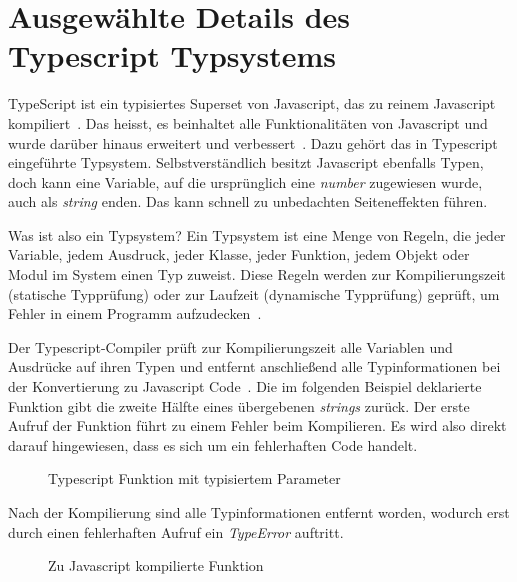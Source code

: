 
\section{Ausgewählte Details des Typescript Typsystems}
\label{sec:basics:typescript}
TypeScript ist ein typisiertes Superset von Javascript, das zu reinem Javascript kompiliert~\cite{typescript}.
Das heisst, es beinhaltet alle Funktionalitäten von Javascript und wurde darüber hinaus erweitert und verbessert~\cite{superset}.
Dazu gehört das in Typescript eingeführte Typsystem. Selbstverständlich besitzt Javascript ebenfalls Typen, doch kann eine Variable,
auf die ursprünglich eine \emph{number} zugewiesen wurde, auch als \emph{string} enden. Das kann schnell zu unbedachten Seiteneffekten führen.

Was ist also ein Typsystem? Ein Typsystem ist eine Menge von Regeln, die jeder Variable, jedem Ausdruck, jeder Klasse,
jeder Funktion, jedem Objekt oder Modul im System einen Typ zuweist.
Diese Regeln werden zur  Kompilierungszeit (statische Typprüfung) oder zur Laufzeit (dynamische Typprüfung) geprüft,
um Fehler in einem Programm aufzudecken~\cite{typescript-typesystem-medium}.

Der Typescript-Compiler prüft zur Kompilierungszeit alle Variablen und Ausdrücke auf ihren Typen und entfernt anschließend alle Typinformationen
bei der Konvertierung zu Javascript Code~\cite{typescript-github-specification}.
Die im folgenden Beispiel deklarierte Funktion gibt die zweite Hälfte eines übergebenen \emph{strings} zurück.
Der erste Aufruf der Funktion führt zu einem Fehler beim Kompilieren. Es wird also direkt darauf hingewiesen, dass es sich um ein fehlerhaften Code handelt.

\begin{figure}[h]
    
    \caption{Typescript Funktion mit typisiertem Parameter}
    \label{fig:basics:typescript:1}
\end{figure}

Nach der Kompilierung sind alle Typinformationen entfernt worden, wodurch erst durch einen fehlerhaften Aufruf
ein \emph{TypeError} auftritt.

\begin{figure}[h]
    
    \caption{Zu Javascript kompilierte Funktion}
    \label{fig:basics:typescript:2}
\end{figure}

